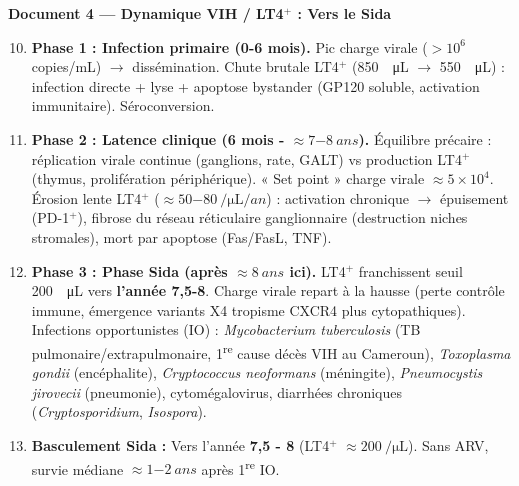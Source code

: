 \documentclass[11pt]{article}
\begin{document}
\begin{exoresolu}
\textbf{Document 4 — Dynamique VIH / LT4$^+$ : Vers le Sida}
\begin{enumerate}
    \setcounter{enumi}{9}
    \item \textbf{Phase 1 : Infection primaire (0-6 mois).} Pic charge virale ($> 10^6$ copies/mL) $\rightarrow$ dissémination. Chute brutale LT4$^+$ (\SI{850}{\per\micro\liter} $\rightarrow$ \SI{550}{\per\micro\liter}) : infection directe + lyse + apoptose bystander (GP120 soluble, activation immunitaire). Séroconversion.
    \item \textbf{Phase 2 : Latence clinique (6 mois - $\approx \SI{7-8}{ans}$).} Équilibre précaire : réplication virale continue (ganglions, rate, GALT) vs production LT4$^+$ (thymus, prolifération périphérique). « Set point » charge virale $\approx 5 \times 10^4$. Érosion lente LT4$^+$ ($\approx \SI{50-80}{\per\micro\liter/an}$) : activation chronique $\rightarrow$ épuisement (PD-1$^+$), fibrose du réseau réticulaire ganglionnaire (destruction niches stromales), mort par apoptose (Fas/FasL, TNF).
    \item \textbf{Phase 3 : Phase Sida (après $\approx \SI{8}{ans}$ ici).} LT4$^+$ franchissent seuil \SI{200}{\per\micro\liter} vers \textbf{l'année 7,5-8}. Charge virale repart à la hausse (perte contrôle immune, émergence variants X4 tropisme CXCR4 plus cytopathiques). Infections opportunistes (IO) : \emph{Mycobacterium tuberculosis} (TB pulmonaire/extrapulmonaire, 1\textsuperscript{re} cause décès VIH au Cameroun), \emph{Toxoplasma gondii} (encéphalite), \emph{Cryptococcus neoformans} (méningite), \emph{Pneumocystis jirovecii} (pneumonie), cytomégalovirus, diarrhées chroniques (\emph{Cryptosporidium}, \emph{Isospora}).
    \item \textbf{Basculement Sida :} Vers l'année \textbf{7,5 - 8} (LT4$^+$ $\approx \SI{200}{\per\micro\liter}$). Sans ARV, survie médiane $\approx \SI{1-2}{ans}$ après 1\textsuperscript{re} IO.
\end{enumerate}


\end{exoresolu}
\end{document}
